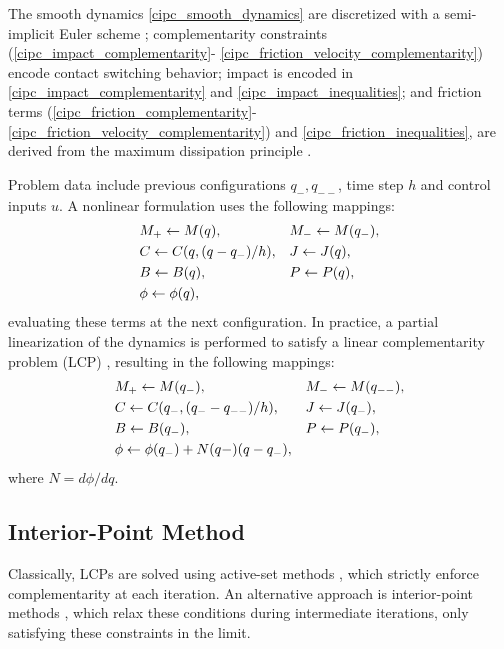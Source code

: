The smooth dynamics \eqref{cipc_smooth_dynamics} are discretized with a semi-implicit Euler scheme \cite{marsden2001discrete}; complementarity constraints (\ref{cipc_impact_complementarity}- \ref{cipc_friction_velocity_complementarity}) encode contact switching behavior; impact is encoded in \eqref{cipc_impact_complementarity} and \eqref{cipc_impact_inequalities}; and friction terms (\ref{cipc_friction_complementarity}-\ref{cipc_friction_velocity_complementarity}) and \eqref{cipc_friction_inequalities}, are derived from the maximum dissipation principle \cite{moreau2011unilateral}.

Problem data include previous configurations $q_{-}, q_{--}$, time step $h$ and control inputs $u$. A nonlinear formulation uses the following mappings:
\begin{align}
	&M_{+} \leftarrow M(q), 
	&&M_{-} \leftarrow M(q_{-}), \notag \\ 
	&C \leftarrow C(q, (q - q_{-}) / h), 
	&&J \leftarrow J(q),  \\ 
	&B \leftarrow B(q), 
	&& P \leftarrow P(q), \notag \\ 
	& \phi \leftarrow \phi(q), \notag
\end{align}
evaluating these terms at the next configuration. In practice, a partial linearization of the dynamics is performed to satisfy a linear complementarity problem (LCP) \cite{stewart1996implicit}, resulting in the following mappings:
\begin{align}
	&M_{+} \leftarrow M(q_{-}), 
	&&M_{-} \leftarrow M(q_{--}), \notag \\ 
	&C \leftarrow C(q_{-}, (q_{-} - q_{--}) / h), 
	&&J \leftarrow J(q_{-}),  \\ 
	&B \leftarrow B(q_{-}), 
	&& P \leftarrow P(q_{-}), \notag \\
	& \phi \leftarrow \phi(q_{-}) + N(q{-}) (q - q_{-}), \notag
\end{align}
where $N = d \phi / d q$.

\subsection{Interior-Point Method}
Classically, LCPs are solved using active-set methods \cite{dirkse1995path}, which strictly enforce complementarity at each iteration. An alternative approach is interior-point methods \cite{kojima1991unified, nocedal2006numerical}, which relax these conditions during intermediate iterations, only satisfying these constraints in the limit.

